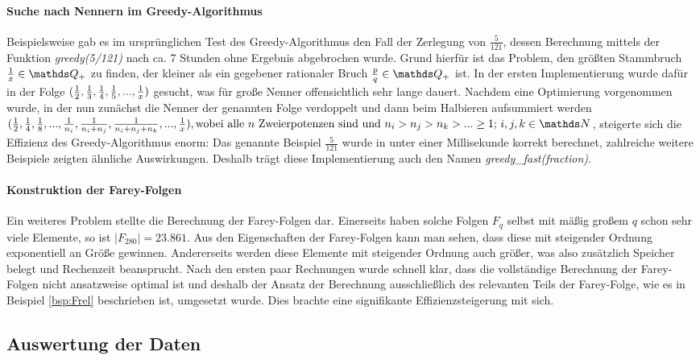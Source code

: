 \paragraph{Suche nach Nennern im Greedy-Algorithmus}Beispielsweise gab es im ursprünglichen Test des Greedy-Algorithmus den Fall der Zerlegung von $\frac{5}{121}$, dessen Berechnung mittels der Funktion \emph{greedy(5/121)} nach ca. 7 Stunden ohne Ergebnis abgebrochen wurde. Grund hierfür ist das Problem, den größten Stammbruch $\uf{x} \in \Q_+$ zu finden, der kleiner als ein gegebener rationaler Bruch $\frac{p}{q} \in \Q_+$ ist. In der ersten Implementierung wurde dafür in der Folge $(\frac{1}{2}, \frac{1}{3}, \frac{1}{4}, \frac{1}{5},...,\frac{1}{x})$ gesucht, was für große Nenner offensichtlich sehr lange dauert. Nachdem eine Optimierung vorgenommen wurde, in der nun zunächst die Nenner der genannten Folge verdoppelt und dann beim Halbieren aufsummiert werden $(\uf{2}, \uf{4}, \uf{8},...,\uf{n_i}, \uf{n_i+n_j}, \uf{n_i+n_j+n_k},...,\uf{x}), \text{wobei alle } n \text{ Zweierpotenzen sind und } n_i>n_j>n_k > ... \geq 1; \, i,j,k \in \N$, steigerte sich die Effizienz des Greedy-Algorithmus enorm: Das genannte Beispiel $\frac{5}{121}$ wurde in unter einer Millisekunde korrekt berechnet, zahlreiche weitere Beispiele zeigten ähnliche Auswirkungen. Deshalb trägt diese Implementierung auch den Namen \emph{greedy\_fast(fraction)}.

\paragraph{Konstruktion der Farey-Folgen}Ein weiteres Problem stellte die Berechnung der Farey-Folgen dar. Einerseits haben solche Folgen $F_q$ selbst mit mäßig großem $q$ schon sehr viele Elemente, so ist \zB $|F_{280}| = 23.861$. Aus den Eigenschaften der Farey-Folgen kann man sehen, dass diese mit steigender Ordnung exponentiell an Größe gewinnen. Andererseits werden diese Elemente mit steigender Ordnung auch größer, was also zusätzlich Speicher belegt und Rechenzeit beansprucht. Nach den ersten paar Rechnungen wurde schnell klar, dass die vollständige Berechnung der Farey-Folgen nicht ansatzweise optimal ist und deshalb der Ansatz der Berechnung ausschließlich des relevanten Teils der Farey-Folge, wie es in Beispiel \ref{bsp:Frel} beschrieben ist, umgesetzt wurde. Dies brachte eine signifikante Effizienzsteigerung mit sich.

\subsection{Auswertung der Daten}

